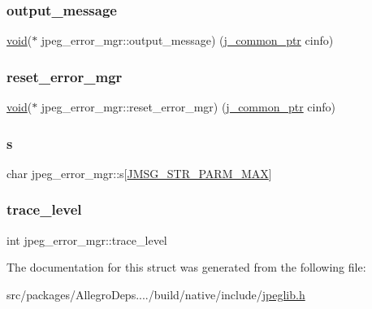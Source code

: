 \subsubsection{\texorpdfstring{output\+\_\+message}{output\_message}}
{\footnotesize\ttfamily \hyperlink{png_8h_ac9c84fa68bbad002983e35ce3663c686}{void}($\ast$ jpeg\+\_\+error\+\_\+mgr\+::output\+\_\+message) (\hyperlink{jpeglib_8h_a1a177ab705cefea8f30ec31a48e62650}{j\+\_\+common\+\_\+ptr} cinfo)}

\mbox{\label{structjpeg__error__mgr_a0260c7b8f7ef606f24716affacf98515}} 
\subsubsection{\texorpdfstring{reset\+\_\+error\+\_\+mgr}{reset\_error\_mgr}}
{\footnotesize\ttfamily \hyperlink{png_8h_ac9c84fa68bbad002983e35ce3663c686}{void}($\ast$ jpeg\+\_\+error\+\_\+mgr\+::reset\+\_\+error\+\_\+mgr) (\hyperlink{jpeglib_8h_a1a177ab705cefea8f30ec31a48e62650}{j\+\_\+common\+\_\+ptr} cinfo)}

\mbox{\label{structjpeg__error__mgr_a0b335f0919d328a95f02440a4ec2216b}} 
\subsubsection{\texorpdfstring{s}{s}}
{\footnotesize\ttfamily char jpeg\+\_\+error\+\_\+mgr\+::s\mbox{[}\hyperlink{jpeglib_8h_abda041041041cc3985c7bb1a32e8b0be}{J\+M\+S\+G\+\_\+\+S\+T\+R\+\_\+\+P\+A\+R\+M\+\_\+\+M\+AX}\mbox{]}}

\mbox{\label{structjpeg__error__mgr_a77328bf266cc3c3c4d9741fc27a4ef9b}} 
\subsubsection{\texorpdfstring{trace\+\_\+level}{trace\_level}}
{\footnotesize\ttfamily int jpeg\+\_\+error\+\_\+mgr\+::trace\+\_\+level}



The documentation for this struct was generated from the following file\+:\begin{DoxyCompactItemize}
\item 
src/packages/\+Allegro\+Deps..../build/native/include/\hyperlink{jpeglib_8h}{jpeglib.\+h}\end{DoxyCompactItemize}
